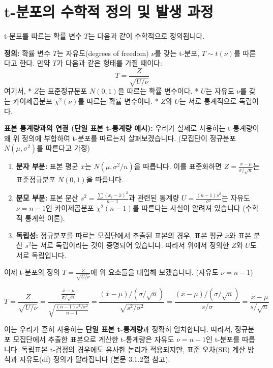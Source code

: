 \documentclass[
  letterpaper,
]{book}
\providecommand{\tightlist}{%
  \setlength{\itemsep}{0pt}\setlength{\parskip}{0pt}}
\begin{document}
\chapter{t-분포의 수학적 정의 및 발생
과정}\label{t-uxbd84uxd3ecuxc758-uxc218uxd559uxc801-uxc815uxc758-uxbc0f-uxbc1cuxc0dd-uxacfcuxc815}

t-분포를 따르는 확률 변수 \(T\)는 다음과 같이 수학적으로 정의됩니다.

\textbf{정의:} 확률 변수 \(T\)는 자유도(degrees of freedom) \(\nu\)를
갖는 t-분포, \(T \sim t(\nu)\)를 따른다고 한다. 만약 \(T\)가 다음과 같은
형태를 가질 때이다: \[T = \frac{Z}{\sqrt{U/\nu}}\] 여기서, * \(Z\)는
표준정규분포 \(N(0, 1)\)을 따르는 확률 변수이다. * \(U\)는 자유도
\(\nu\)를 갖는 카이제곱분포 \(\chi^2(\nu)\)를 따르는 확률 변수이다. *
\(Z\)와 \(U\)는 서로 통계적으로 독립이다.

\textbf{표본 통계량과의 연결 (단일 표본 t-통계량 예시):} 우리가 실제로
사용하는 t-통계량이 왜 위 정의에 부합하여 t-분포를 따르는지
살펴보겠습니다. (모집단이 정규분포 \(N(\mu, \sigma^2)\)를 따른다고 가정)

\begin{enumerate}
\def\labelenumi{\arabic{enumi}.}
\tightlist
\item
  \textbf{분자 부분:} 표본 평균 \(\bar{x}\)는 \(N(\mu, \sigma^2/n)\)을
  따릅니다. 이를 표준화하면
  \(Z = \frac{\bar{x} - \mu}{\sigma/\sqrt{n}}\)는 표준정규분포
  \(N(0, 1)\)을 따릅니다.
\item
  \textbf{분모 부분:} 표본 분산
  \(s^2 = \frac{\sum(x_i - \bar{x})^2}{n-1}\)과 관련된 통계량
  \(U = \frac{(n-1)s^2}{\sigma^2}\)는 자유도 \(\nu = n-1\)인
  카이제곱분포 \(\chi^2(n-1)\)를 따른다는 사실이 알려져 있습니다 (수학적
  통계학 이론).
\item
  \textbf{독립성:} 정규분포를 따르는 모집단에서 추출된 표본의 경우, 표본
  평균 \(\bar{x}\)와 표본 분산 \(s^2\)는 서로 독립이라는 것이 증명되어
  있습니다. 따라서 위에서 정의한 \(Z\)와 \(U\)도 서로 독립입니다.
\end{enumerate}

이제 t-분포의 정의 \(T = \frac{Z}{\sqrt{U/\nu}}\)에 위 요소들을 대입해
보겠습니다. (자유도 \(\nu = n-1\))

\[T = \frac{Z}{\sqrt{U/\nu}} = \frac{\frac{\bar{x} - \mu}{\sigma/\sqrt{n}}}{\sqrt{\frac{(n-1)s^2/\sigma^2}{n-1}}} = \frac{(\bar{x} - \mu)/(\sigma/\sqrt{n})}{\sqrt{s^2/\sigma^2}} = \frac{(\bar{x} - \mu)/(\sigma/\sqrt{n})}{s/\sigma} = \frac{\bar{x} - \mu}{s/\sqrt{n}}\]

이는 우리가 흔히 사용하는 \textbf{단일 표본 t-통계량}과 정확히
일치합니다. 따라서, 정규분포 모집단에서 추출한 표본으로 계산한
t-통계량은 자유도 \(\nu = n-1\)인 t-분포를 따릅니다. 독립표본 t-검정의
경우에도 유사한 논리가 적용되지만, 표준 오차(SE) 계산 방식과 자유도(df)
정의가 달라집니다 (본문 3.1.2절 참고).
\end{document}
